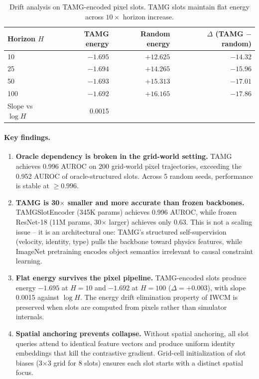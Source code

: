 \documentclass[12pt]{article}
\begin{document}
\begin{table}[h]
\centering
\caption{Drift analysis on TAMG-encoded pixel slots. TAMG slots maintain flat energy across $10\times$ horizon increase.}
\label{tab:tamg_drift}
\begin{tabular}{@{}lrrr@{}}
\toprule
Horizon $H$ & TAMG energy & Random energy & $\Delta$ (TAMG $-$ random) \\
\midrule
10 & $-1.695$ & $+12.625$ & $-14.32$ \\
25 & $-1.694$ & $+14.265$ & $-15.96$ \\
50 & $-1.693$ & $+15.313$ & $-17.01$ \\
100 & $-1.692$ & $+16.165$ & $-17.86$ \\
\midrule
Slope vs $\log H$ & 0.0015 & & \\
\bottomrule
\end{tabular}
\end{table}

\paragraph{Key findings.}

\begin{enumerate}
  \item \textbf{Oracle dependency is broken in the grid-world setting.} TAMG achieves 0.996 AUROC on 200 grid-world pixel trajectories, exceeding the 0.952 AUROC of oracle-structured slots. Across 5 random seeds, performance is stable at $\geq 0.996$.
  
  \item \textbf{TAMG is 30$\times$ smaller and more accurate than frozen backbones.} TAMGSlotEncoder (345K params) achieves 0.996 AUROC, while frozen ResNet-18 (11M params, 30$\times$ larger) achieves only 0.63. This is not a scaling issue -- it is an architectural one: TAMG's structured self-supervision (velocity, identity, type) pulls the backbone toward physics features, while ImageNet pretraining encodes object semantics irrelevant to causal constraint learning.
  
  \item \textbf{Flat energy survives the pixel pipeline.} TAMG-encoded slots produce energy $-1.695$ at $H=10$ and $-1.692$ at $H=100$ ($\Delta = +0.003$), with slope 0.0015 against $\log H$. The energy drift elimination property of IWCM is preserved when slots are computed from pixels rather than simulator internals.
  
  \item \textbf{Spatial anchoring prevents collapse.} Without spatial anchoring, all slot queries attend to identical feature vectors and produce uniform identity embeddings that kill the contrastive gradient. Grid-cell initialization of slot biases (3$\times$3 grid for 8 slots) ensures each slot starts with a distinct spatial focus.
\end{enumerate}
\end{document}
